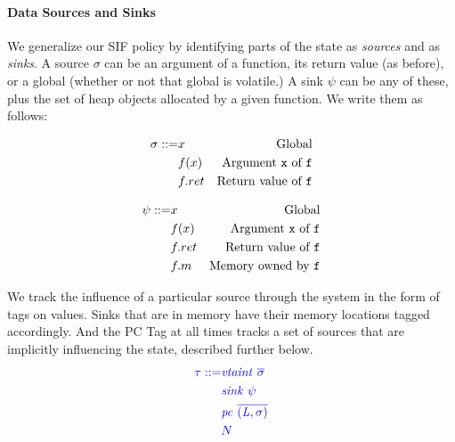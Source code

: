 \documentclass[acmsmall,review,anonymous]{acmart}\settopmatter{printfolios=true,printccs=false,printacmref=false}
\begin{document}
\paragraph*{Data Sources and Sinks}

We generalize our SIF policy by identifying parts of the state as
{\em sources} and as {\em sinks}.
A source \(\sigma\) can be an argument of a function, its return value (as before), or a global
(whether or not that global is volatile.)
A sink \(\psi\) can be any of these, plus the set of heap objects allocated by a given function.
We write them as follows:

\begin{minipage}{0.5\textwidth}
  \[\begin{aligned}
  \sigma ::= & x & \textnormal{Global} \\
  & f(x) & \textnormal{Argument {\tt x} of {\tt f}} \\
  & f.ret & \textnormal{Return value of {\tt f}} \\
  \end{aligned}\]
\end{minipage}
\begin{minipage}{0.5\textwidth}
  \[\begin{aligned}
  \psi ::= & x & \textnormal{Global} \\
  & f(x) & \textnormal{Argument {\tt x} of {\tt f}} \\
  & f.ret & \textnormal{Return value of {\tt f}} \\
  & f.m & \textnormal{Memory owned by {\tt f}} \\
  \end{aligned}\]
\end{minipage}

We track the influence of a particular source through the system in the form
of tags on values. Sinks that are in memory have their memory locations tagged accordingly. And
the PC Tag at all times tracks a set of sources that are implicitly influencing the state, described
further below.
%
\[  \color{blue}
\begin{aligned}
  \tau ::= & \mathit{\color{blue} vtaint ~ \overline{\sigma}} \\
  & \mathit{sink} ~ \psi \\
  & \mathit{\color{blue} pc ~ \overline{(L,\sigma)}} \\
  & {\color{blue} N} \\
\end{aligned}\]
%


\end{document}
